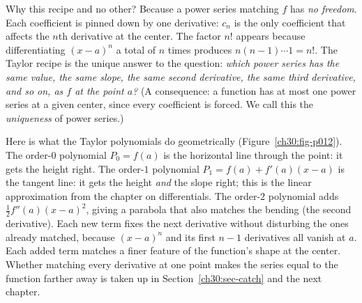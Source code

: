 \begin{whybox}
Why this recipe and no other? Because a power series matching $f$ has \emph{no freedom}. Each coefficient is pinned down by one derivative: $c_n$ is the only coefficient that affects the $n$th derivative at the center. The factor $n!$ appears because differentiating $(x-a)^n$ a total of $n$ times produces $n(n-1)\cdots 1 = n!$. The Taylor recipe is the unique answer to the question: \emph{which power series has the same value, the same slope, the same second derivative, the same third derivative, and so on, as $f$ at the point $a$?} (A consequence: a function has at most one power series at a given center, since every coefficient is forced. We call this the \emph{uniqueness} of power series.)
\end{whybox}

\begin{happeningbox}
Here is what the Taylor polynomials do geometrically (Figure~\ref{ch30:fig-p012}). The order-$0$ polynomial $P_0 = f(a)$ is the horizontal line through the point: it gets the height right. The order-$1$ polynomial $P_1 = f(a) + f'(a)(x-a)$ is the tangent line: it gets the height \emph{and} the slope right; this is the linear approximation from the chapter on differentials. The order-$2$ polynomial adds $\tfrac{1}{2}f''(a)(x-a)^2$, giving a parabola that also matches the bending (the second derivative). Each new term fixes the next derivative without disturbing the ones already matched, because $(x-a)^{n}$ and its first $n-1$ derivatives all vanish at $a$. Each added term matches a finer feature of the function's shape at the center. Whether matching every derivative at one point makes the series equal to the function farther away is taken up in Section~\ref{ch30:sec-catch} and the next chapter.
\end{happeningbox}

